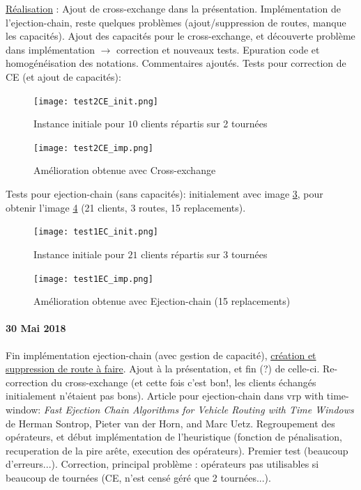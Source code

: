 \documentclass[a4paper,11pt]{article}%
\begin{document}
\underline{Réalisation} : Ajout de cross-exchange dans la présentation. Implémentation de l'ejection-chain, reste quelques problèmes (ajout/suppression de routes, manque les capacités). Ajout des capacités pour le cross-exchange, et découverte problème dans implémentation $\rightarrow$ correction et nouveaux tests. Epuration code et homogénéisation des notations. Commentaires ajoutés. Tests pour correction de CE (et ajout de capacités): 

\begin{figure}[ht]
\centering
\texttt{[image: test2CE\_init.png]}
	\caption{Instance initiale pour $10$ clients répartis sur 2 tournées}
	\label{test2CE_init}
\end{figure}

\begin{figure}[ht]
\centering
\texttt{[image: test2CE\_imp.png]}
	\caption{Amélioration obtenue avec Cross-exchange}	
	\label{test2CE_imp}
\end{figure}

Tests pour ejection-chain (sans capacités): initialement avec image \ref{test1EC_init}, pour obtenir l'image \ref{test1EC_imp} (21 clients, 3 routes, 15 replacements).

\begin{figure}[ht]
\centering
\texttt{[image: test1EC\_init.png]}
	\caption{Instance initiale pour $21$ clients répartis sur 3 tournées}
	\label{test1EC_init}
\end{figure}

\begin{figure}[ht]
\centering
\texttt{[image: test1EC\_imp.png]}
	\caption{Amélioration obtenue avec Ejection-chain (15 replacements)}
	\label{test1EC_imp}
\end{figure}

\paragraph*{30 Mai 2018}

Fin implémentation ejection-chain (avec gestion de capacité), \underline{création et suppression de route à faire}. Ajout à la présentation, et fin (?) de celle-ci. Re-correction du cross-exchange (et cette fois c'est bon!, les clients échangés initialement n'étaient pas bons). Article pour ejection-chain dans vrp with time-window: \emph{Fast Ejection Chain Algorithms for
Vehicle Routing with Time Windows} de Herman Sontrop, Pieter van der Horn, and Marc Uetz.
Regroupement des opérateurs, et début implémentation de l'heuristique (fonction de pénalisation, recuperation de la pire arête, execution des opérateurs). Premier test (beaucoup d'erreurs...). Correction, principal problème : opérateurs pas utilisables si beaucoup de tournées (CE, n'est censé géré que 2 tournées...). 
\end{document}
